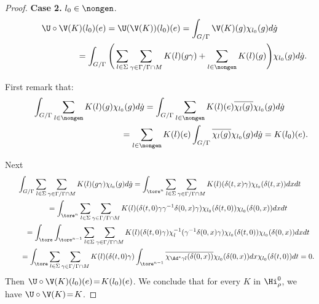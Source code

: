 \begin{proof}
 \textbf{Case 2.}   $l_0\in \nongen$.
\begin{gather*}
\U\circ \V(K)(l_0)(e)  = \U( \V(K))(l_0)(e) = \int_{G/ \Gamma} \V(K)(g) \chi_{l_0}(g) d\dot{g}\\
\phantom{\U\circ \V(K)(l_0)(e)}{} = \int_{G/ \Gamma}\Bigg( \sum_{l\in \Sigma} \sum_{\gamma\in
\Gamma/\Gamma\cap M} K(l)(g\gamma)+ \sum _{l\in \nongen} K(l)
(g)\Bigg) \chi_{l_0}(g) d\dot{g}.
\end{gather*}

First remark that:
\begin{gather*}
\int_{G/ \Gamma}   \sum_{l\in \nongen} K(l) (g) \chi_{l_0}(g)
d\dot{g}  = \int_{G/ \Gamma} \sum_{l\in \nongen}
K(l) (e) \overline{\chi_{l}(g)} \chi_{l_0}(g )d\dot{g}\\
\hphantom{\int_{G/ \Gamma}   \sum_{l\in \nongen} K(l) (g) \chi_{l_0}(g) d\dot{g} }{}
 =  \sum_{l\in \nongen} K(l) (e) \int_{G/ \Gamma}
\overline{\chi_{l}(g)} \chi_{l_0}(g)
 d\dot{g}
  = K(l_0)(e).
\end{gather*}

Next
\begin{gather*}
 \int_{G/ \Gamma}  \sum_{l\in \Sigma} \sum_{\gamma\in
\Gamma/ \Gamma\cap M} K(l)(g \gamma)\chi_{l_0}(g) d\dot{g}
 =
\int_{\tore^n}  \sum_{l\in \Sigma} \sum_{\gamma\in \Gamma/
\Gamma\cap M} K(l)(\delta(t, x)\gamma) \chi_{l_0}(\delta(t, x))
dx dt \\
 \qquad {} =  \int_{\tore^n}  \sum_{l\in \Sigma} \sum_{\gamma\in \Gamma/
\Gamma\cap M} K(l)(\delta(t, 0)\gamma \gamma^{-1}
\delta(0,x)\gamma)\chi_{l_0}(\delta(t, 0))
 \chi_{l_0}(\delta(0, x)) dx dt\\
\qquad {} =  \int_\tore \int_{\tore^{n-1}}  \sum_{l\in \Sigma}
\sum_{\gamma\in \Gamma/\Gamma\cap M} K(l)(\delta(t, 0)\gamma)
\chi_l^{-1}(\gamma^{-1} \delta(0,x)\gamma) \chi_{l_0}(\delta(t,
0))\chi_{l_0}(\delta(0, x)) dx dt\\
\qquad{} =  \int_\tore  \sum_{l\in \Sigma} \sum_{\gamma\in
\Gamma/\Gamma\cap M}
K(l)(\delta(t,0)\gamma)\int_{\tore^{n-1}}\overline{\chi_{\Ad^*\gamma
l}(\delta(0, x))} \chi_{l_0}(\delta(0, x)) dx \chi_{l_0}(\delta(t,
0))dt =0.
\end{gather*}
Then $\U\circ\V (K)(l_0)(e)\! =\! K(l_0)(e)$.
We conclude that for every $K$ in $\Hi_\rho^0$, we have $\U\circ\V
(K)\! =\! K $.



\end{proof}
